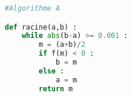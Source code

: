 \begin{lstlisting}[language=python]
#Algorithme A

def racine(a,b) :
	while abs(b-a) >= 0.001 :
		m = (a+b)/2
		if f(m) < 0 :
			b = m
		else :
			a = m
		return m
\end{lstlisting}